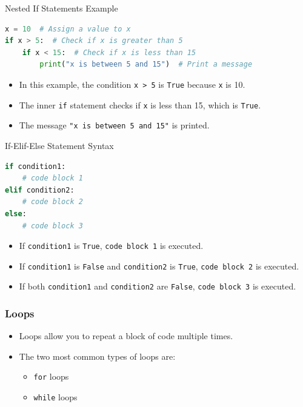 \begin{frame}[fragile]{Nested If Statements Example}
    \begin{lstlisting}[language=Python]
x = 10  # Assign a value to x
if x > 5:  # Check if x is greater than 5
    if x < 15:  # Check if x is less than 15
        print("x is between 5 and 15")  # Print a message
    \end{lstlisting}
    \begin{itemize}
        \item In this example, the condition \texttt{x > 5} is \texttt{True} because \texttt{x} is 10.
        \item The inner \texttt{if} statement checks if \texttt{x} is less than 15, which is \texttt{True}.
        \item The message \texttt{"x is between 5 and 15"} is printed.
    \end{itemize}
\end{frame}

\begin{frame}[fragile]{If-Elif-Else Statement Syntax}
    \begin{lstlisting}[language=Python]
if condition1:
    # code block 1
elif condition2:
    # code block 2
else:
    # code block 3
    \end{lstlisting}
    \begin{itemize}
        \item If \texttt{condition1} is \texttt{True}, \texttt{code block 1} is executed.
        \item If \texttt{condition1} is \texttt{False} and \texttt{condition2} is \texttt{True}, \texttt{code block 2} is executed.
        \item If both \texttt{condition1} and \texttt{condition2} are \texttt{False}, \texttt{code block 3} is executed.
    \end{itemize}
\end{frame} 


\begin{frame}
    \frametitle{Loops}
    \begin{itemize}
        \item Loops allow you to repeat a block of code multiple times.
        \item The two most common types of loops are:
        \begin{itemize}
            \item \texttt{for} loops
            \item \texttt{while} loops
        \end{itemize}
    \end{itemize}           
\end{frame}
